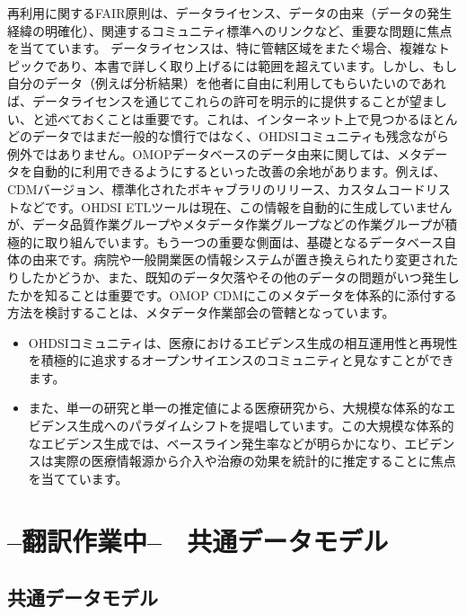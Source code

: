 \documentclass[
  11pt]{book}
\makeatletter
\newenvironment{kframe}{%
\medskip{}
\setlength{\fboxsep}{.8em}
 \def\at@end@of@kframe{}%
 \ifinner\ifhmode%
  \def\at@end@of@kframe{\end{minipage}}%
  \begin{minipage}{\columnwidth}%
 \fi\fi%
 \def\FrameCommand##1{\hskip\@totalleftmargin \hskip-\fboxsep
 \colorbox{myShadeColor}{##1}\hskip-\fboxsep
     \hskip-\linewidth \hskip-\@totalleftmargin \hskip\columnwidth}%
 \MakeFramed {\advance\hsize-\width
   \@totalleftmargin\z@ \linewidth\hsize
   \@setminipage}}%
 {\par\unskip\endMakeFramed%
 \at@end@of@kframe}
\newenvironment{rmdblock}[1]
  {
  \begin{itemize}
  \renewcommand{\labelitemi}{
    \raisebox{-.7\height}[0pt][0pt]{
      {\setkeys{Gin}{width=3em,keepaspectratio}\texttt{[image: images/\#1]}}
    }
  }
  \setlength{\fboxsep}{1em}
  \begin{kframe}
  \item
  }
  {
  \end{kframe}
  \end{itemize}
  }
\newenvironment{rmdsummary}
  {\begin{rmdblock}{summary}}
  {\end{rmdblock}}
\theoremstyle{definition}
\theoremstyle{definition}
\theoremstyle{definition}
\theoremstyle{definition}
\theoremstyle{remark}
\makeatother
\begin{document}
再利用に関するFAIR原則は、データライセンス、データの由来（データの発生経緯の明確化）、関連するコミュニティ標準へのリンクなど、重要な問題に焦点を当てています。 データライセンスは、特に管轄区域をまたぐ場合、複雑なトピックであり、本書で詳しく取り上げるには範囲を超えています。しかし、もし自分のデータ（例えば分析結果）を他者に自由に利用してもらいたいのであれば、データライセンスを通じてこれらの許可を明示的に提供することが望ましい、と述べておくことは重要です。これは、インターネット上で見つかるほとんどのデータではまだ一般的な慣行ではなく、OHDSIコミュニティも残念ながら例外ではありません。OMOPデータベースのデータ由来に関しては、メタデータを自動的に利用できるようにするといった改善の余地があります。例えば、CDMバージョン、標準化されたボキャブラリのリリース、カスタムコードリストなどです。OHDSI ETLツールは現在、この情報を自動的に生成していませんが、データ品質作業グループやメタデータ作業グループなどの作業グループが積極的に取り組んでいます。もう一つの重要な側面は、基礎となるデータベース自体の由来です。病院や一般開業医の情報システムが置き換えられたり変更されたりしたかどうか、また、既知のデータ欠落やその他のデータの問題がいつ発生したかを知ることは重要です。OMOP CDMにこのメタデータを体系的に添付する方法を検討することは、メタデータ作業部会の管轄となっています。

\begin{rmdsummary}
\begin{itemize}
\item
  OHDSIコミュニティは、医療におけるエビデンス生成の相互運用性と再現性を積極的に追求するオープンサイエンスのコミュニティと見なすことができます。
\item
  また、単一の研究と単一の推定値による医療研究から、大規模な体系的なエビデンス生成へのパラダイムシフトを提唱しています。この大規模な体系的なエビデンス生成では、ベースライン発生率などが明らかになり、エビデンスは実際の医療情報源から介入や治療の効果を統計的に推定することに焦点を当てています。
\end{itemize}
\end{rmdsummary}

\part{--翻訳作業中--　共通データモデル}\label{part-ux7ffbux8a33ux4f5cux696dux4e2d-ux5171ux901aux30c7ux30fcux30bfux30e2ux30c7ux30eb}

\chapter{共通データモデル}\label{CommonDataModel}
\end{document}
